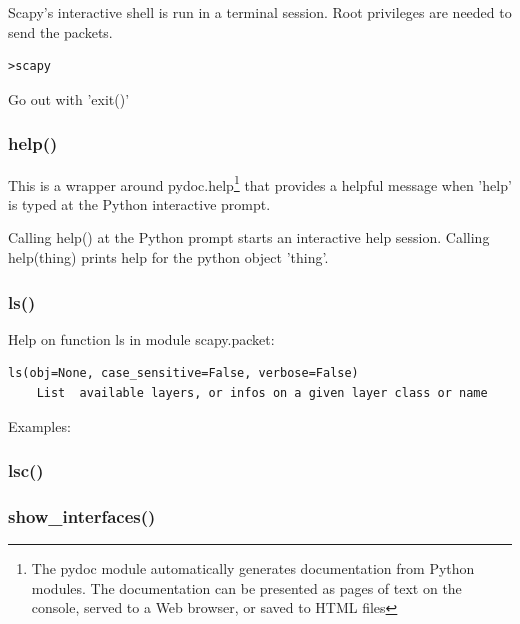 \documentclass[11pt,a4paper]{article}
\begin{document}
Scapy's interactive shell is run in a terminal session. Root privileges are needed to send the packets.

\begin{lstlisting}
>scapy 
\end{lstlisting}

Go out with 'exit()'

\subsubsection{help()}
This is a wrapper around pydoc.help\footnote{The pydoc module automatically generates documentation from Python modules. The documentation can be presented as pages of text on the console, served to a Web browser, or saved to HTML files} that provides a helpful message when 'help' is typed at the Python interactive prompt.

Calling help() at the Python prompt starts an interactive help session.
Calling help(thing) prints help for the python object 'thing'.

\subsubsection{ls()}
Help on function ls in module scapy.packet:
\begin{lstlisting}
ls(obj=None, case_sensitive=False, verbose=False)
    List  available layers, or infos on a given layer class or name
\end{lstlisting}
Examples:


\subsubsection{lsc()}

\subsubsection{show\_interfaces()}
\end{document}
